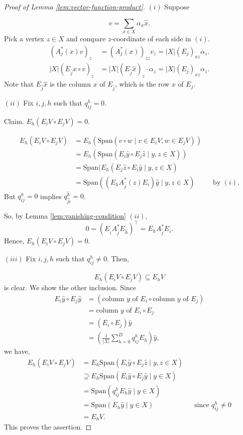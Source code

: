 \documentclass[
]{book}
\theoremstyle{definition}
\theoremstyle{definition}
\theoremstyle{definition}
\theoremstyle{definition}
\theoremstyle{remark}
\begin{document}
\begin{proof}[Proof of Lemma \ref{lem:vector-function-product}]
\leavevmode

\((i)\) Suppose

\[v = \sum_{x\in X}\alpha_x \hat{x}.\]
Pick a vertex \(z\in X\) and compare \(z\)-coordinate of each side in \((i)\).
\begin{align}
(A^*_j(x)v)_z & = (A^*_j(x))_{zz}v_z = |X|(E_j)_{xz}\alpha_z.\\
|X|(E_{\hat{j}}\hat{x}\circ v)_z & = |X|(E_{\hat{j}}\hat{x})_z\cdot \alpha_z  = |X|(E_j)_{xz}\alpha_z.
\end{align}
Note that \(E_{\hat{j}}\hat{x}\) is the column \(x\) of \(E_{\hat{j}}\), which is the row \(x\) of \(E_j\).

\((ii)\) Fix \(i, j, h\) such that \(q^h_{ij} = 0\).

Claim. \(E_h(E_iV \circ E_jV) = 0\).

\begin{align}
E_h(E_iV \circ E_jV) & = E_h(\mathrm{Span}(v\circ w\mid v\in E_iV, w\in E_jV))\\
& = E_h(\mathrm{Span}(E_i\hat{y}\circ E_j\hat{z}\mid y,z\in X))\\
& = \mathrm{Span}(E_h(E_j\hat{z}\circ E_i\hat{y}\mid y,z\in X)\\
& = \mathrm{Span}((E_hA^*_{\hat{j}}(z)E_i)\hat{y}\mid y,z\in X) && \text{by $(i)$.}
\end{align}
But \(q^h_{ij} = 0\) implies \(q^{\hat{h}}_{\hat{j}\hat{i}} = 0\).

So, by Lemma \ref{lem:vanishing-condition} \((ii)\),
\[ 0 = (E_{\hat{i}}A^*_{\hat{j}}E_{\hat{h}})^\top = E_h A^*_{\hat{j}}E_i.\]
Hence, \(E_h(E_iV\circ E_jV) = 0\).

\((iii)\) Fix \(i, j, h\) such that \(q^h_{ij}\neq 0\). Then,

\[E_h(E_iV \circ E_jV)\subseteq E_hV\]
is clear. We show the other inclusion. Since
\begin{align}
E_i\hat{y} \circ E_j\hat{y} &=  (\text{column $y$ of $E_i$}\circ \text{column $y$ of $E_j$}) \\
&  = \text{column $y$ of $E_i\circ E_j$}\\
&  = (E_i\circ E_j)\hat{y}\\
&  = \left(\frac{1}{|X|}\sum_{h=0}^D q^h_{ij}E_h\right)\hat{y},
\end{align}
we have,
\begin{align}
E_h(E_iV\circ E_jV) & = E_h\mathrm{Span}(E_i\hat{y}\circ E_j\hat{z}\mid y,z\in X)\\
& \supseteq E_h \mathrm{Span}(E_i\hat{y}\circ E_j\hat{y}\mid y\in X)\\
& = \mathrm{Span}(q^h_{ij}E_h\hat{y}\mid y\in X)\\
& = \mathrm{Span}(E_h\hat{y}\mid y\in X) && \text{since $q^h_{ij}\neq 0$}\\
& = E_hV.
\end{align}
This proves the assertion.

\end{proof}
\end{document}
